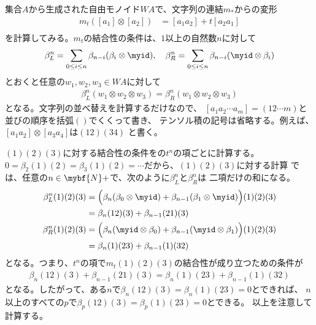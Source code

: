 	集合$A$から生成された自由モノイド$WA$で、文字列の連結$m_*$からの変形
	\begin{equation}\label{eq:積の変形その一}\begin{split} %
		m_t([a_1]\otimes[a_2]) &= [a_1a_2] + t[a_2a_1] \\
	\end{split}\end{equation} %
	を計算してみる。$m_t$の結合性の条件は、$1$以上の自然数$n$に対して
	\begin{equation*}\begin{split} %
		\beta_L^n = \sum_{0\le i\le n}\beta_{n-i}(\beta_i\otimes \myid)
		,\quad
		\beta_R^n = \sum_{0\le i\le n}\beta_{n-i}(\myid\otimes \beta_i)
	\end{split}\end{equation*} %
	とおくと任意の$w_1,w_2,w_3\in WA$に対して
	\begin{equation*}\begin{split} %
		\beta_L^n(w_1\otimes w_2\otimes w_3)
		=\beta_R^n(w_1\otimes w_2\otimes w_3)
	\end{split}\end{equation*} %
	となる。文字列の並べ替えを計算するだけなので、
	$[a_1a_2\cdots a_m]=(12\cdots m)$と並びの順序を括弧$()$でくくって書き、
	テンソル積の記号は省略する。例えば、$[a_1a_2]\otimes[a_3a_4]$は$(12)(34)$
	と書く。

	$(1)(2)(3)$に対する結合性の条件をの$t^n$の項ごとに計算する。
	$0=\beta_2(1)(2)=\beta_3(1)(2)=\cdots$だから、$(1)(2)(3)$に対する計算
	では、任意の$n\in\mybf{N}+$で、次のように$\beta_L^n$と$\beta_R^n$は
	二項だけの和になる。
	\begin{equation*}\begin{split} %
		\beta_L^n(1)(2)(3) &= \Bigl(\beta_n(\beta_0\otimes \myid)
		+\beta_{n-1}(\beta_1\otimes \myid)\Bigr)(1)(2)(3) \\
		&= \beta_n(12)(3) + \beta_{n-1}(21)(3) \\
		\beta_R^n(1)(2)(3) &= \Bigl(\beta_n(\myid\otimes \beta_0)
		+\beta_{n-1}(\myid\otimes \beta_1)\Bigr)(1)(2)(3) \\
		&= \beta_n(1)(23) + \beta_{n-1}(1)(32) \\
	\end{split}\end{equation*} %
	となる。つまり、$t^n$の項で$m_t(1)(2)(3)$の結合性が成り立つための条件が
	\begin{equation*}\begin{split} %
		\beta_n(12)(3) + \beta_{n-1}(21)(3)
		=\beta_n(1)(23) + \beta_{n-1}(1)(32)
	\end{split}\end{equation*} %
	となる。したがって、ある$n$で$\beta_n(12)(3)=\beta_n(1)(23)=0$とできれば、
	$n$以上のすべての$p$で$\beta_p(12)(3)=\beta_p(1)(23)=0$とできる。
	以上を注意して計算する。

